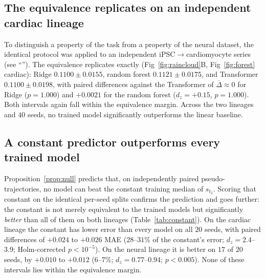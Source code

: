 \documentclass[10pt,letterpaper]{article}
\begin{document}
\subsection*{The equivalence replicates on an independent cardiac lineage}
\label{subsec:res_cardiac}

To distinguish a property of the task from a property of the neural dataset, the identical protocol was applied to an independent iPSC$\rightarrow$cardiomyocyte series (see ``''). The equivalence replicates exactly (Fig~\ref{fig:raincloud}B, Fig~\ref{fig:forest} cardiac): Ridge $0.1100\pm0.0155$, random forest $0.1121\pm0.0175$, and Transformer $0.1100\pm0.0198$, with paired differences against the Transformer of $\overline{\Delta}\approx0$ for Ridge ($p=1.000$) and $+0.0021$ for the random forest ($d_z=+0.15$, $p=1.000$). Both intervals again fall within the equivalence margin. Across the two lineages and $40$ seeds, no trained model significantly outperforms the linear baseline.

\subsection*{A constant predictor outperforms every trained model}
\label{subsec:res_constant}

Proposition~\ref{prop:null} predicts that, on independently paired pseudo-trajectories, no model can beat the constant training median of $s_{t_2}$. Scoring that constant on the identical per-seed splits confirms the prediction and goes further: the constant is not merely equivalent to the trained models but significantly \emph{better} than all of them on both lineages (Table~\ref{tab:constant}). On the cardiac lineage the constant has lower error than every model on all $20$ seeds, with paired differences of $+0.024$ to $+0.026$ MAE ($28$--$31\%$ of the constant's error; $d_z=2.4$--$3.9$; Holm-corrected $p<10^{-5}$). On the neural lineage it is better on $17$ of $20$ seeds, by $+0.010$ to $+0.012$ ($6$--$7\%$; $d_z=0.77$--$0.94$; $p<0.005$). None of these intervals lies within the equivalence margin.
\end{document}
